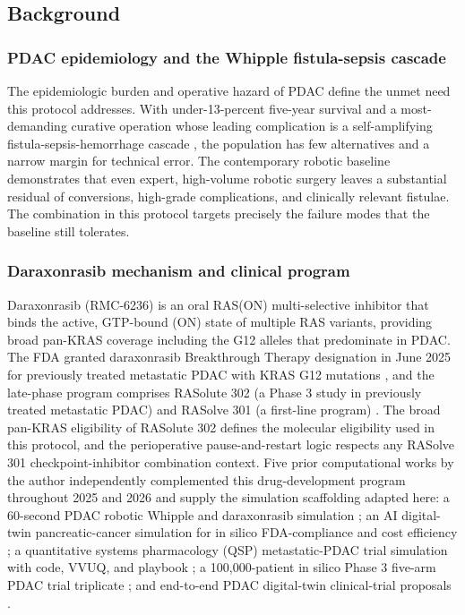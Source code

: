 \subsection{Background}

\subsubsection*{PDAC epidemiology and the Whipple fistula-sepsis cascade}

The epidemiologic burden and operative hazard of PDAC define the unmet need this
protocol addresses. With under-13-percent five-year survival \cite{Siegel2025}
and a most-demanding curative operation whose leading complication is a
self-amplifying fistula-sepsis-hemorrhage cascade \cite{Bassi2017}, the
population has few alternatives and a narrow margin for technical error. The
contemporary robotic baseline \cite{DutchCohort2025} demonstrates that even
expert, high-volume robotic surgery leaves a substantial residual of conversions,
high-grade complications, and clinically relevant fistulae. The combination in
this protocol targets precisely the failure modes that the baseline still
tolerates.

\subsubsection*{Daraxonrasib mechanism and clinical program}

Daraxonrasib (RMC-6236) is an oral RAS(ON) multi-selective inhibitor that binds
the active, GTP-bound (ON) state of multiple RAS variants, providing broad
pan-KRAS coverage including the G12 alleles that predominate in PDAC. The FDA
granted daraxonrasib Breakthrough Therapy designation in June 2025 for previously
treated metastatic PDAC with KRAS G12 mutations \cite{revbreakthrough}, and the
late-phase program comprises RASolute 302 (a Phase 3 study in previously treated
metastatic PDAC) and RASolve 301 (a first-line program) \cite{rasolute302}. The
broad pan-KRAS eligibility of RASolute 302 defines the molecular eligibility used
in this protocol, and the perioperative pause-and-restart logic respects any
RASolve 301 checkpoint-inhibitor combination context. Five prior computational
works by the author independently complemented this drug-development program
throughout 2025 and 2026 and supply the simulation scaffolding adapted here: a
60-second PDAC robotic Whipple and daraxonrasib simulation
\cite{kawchak_2026_20196639}; an AI digital-twin pancreatic-cancer simulation for
in silico FDA-compliance and cost efficiency \cite{kawchak_2025_17239510}; a
quantitative systems pharmacology (QSP) metastatic-PDAC trial simulation with code,
VVUQ, and playbook \cite{kawchak_2025_17001137}; a 100,000-patient in silico
Phase 3 five-arm PDAC trial triplicate \cite{kawchak_2025_16415815}; and
end-to-end PDAC digital-twin clinical-trial proposals \cite{kawchak_2025_15735068}.

